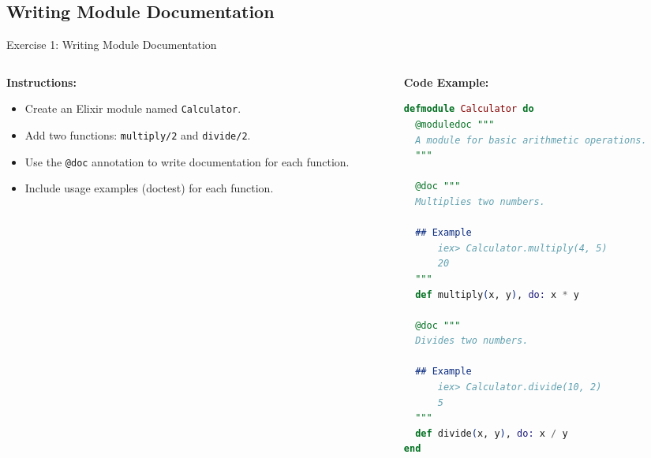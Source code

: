 \documentclass[aspectratio=169, table]{beamer}
\begin{document}
\subsection{Writing Module Documentation}
\begin{frame}[fragile]{Exercise 1: Writing Module Documentation}
\vspace{15pt}
\begin{columns}

\begin{column}[t]{0.45\textwidth}
\textbf{Instructions:}
\begin{itemize}
  \item Create an Elixir module named \texttt{Calculator}.  
  \item Add two functions: \texttt{multiply/2} and \texttt{divide/2}.  
  \item Use the \texttt{@doc} annotation to write documentation for each function.  
  \item Include usage examples (doctest) for each function.  
\end{itemize}
\end{column}

\begin{column}[t]{0.55\textwidth}
\textbf{Code Example:}
\begin{lstlisting}[language=Elixir, basicstyle=\ttfamily\tiny]
defmodule Calculator do
  @moduledoc """
  A module for basic arithmetic operations.
  """

  @doc """
  Multiplies two numbers.

  ## Example
      iex> Calculator.multiply(4, 5)
      20
  """
  def multiply(x, y), do: x * y

  @doc """
  Divides two numbers.

  ## Example
      iex> Calculator.divide(10, 2)
      5
  """
  def divide(x, y), do: x / y
end
\end{lstlisting}
\end{column}

\end{columns}
\end{frame}
\end{document}
